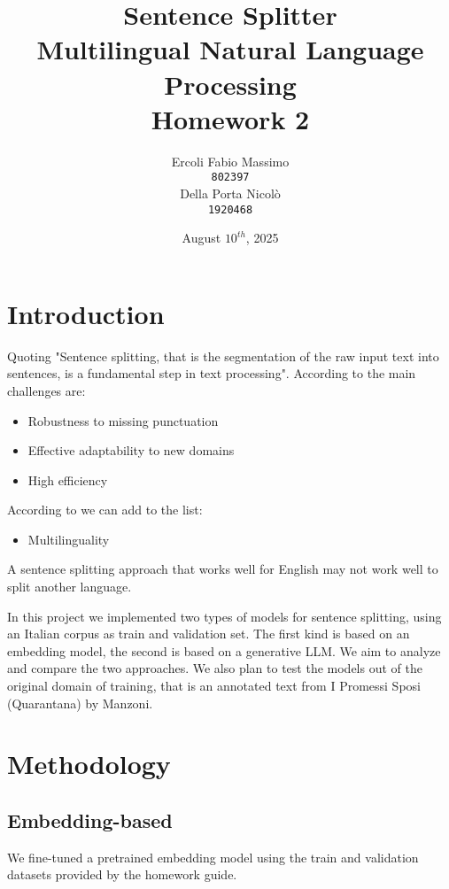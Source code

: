 \documentclass[11pt]{article}
\title{%
	Sentence Splitter\\
	\large Multilingual Natural Language Processing \\
	Homework 2}
\date{August $10^{th}$, 2025}
\author{Ercoli Fabio Massimo \\
\texttt{802397} \\\And
Della Porta Nicolò \\
\texttt{1920468} \\}
\begin{document}
\maketitle

\section{Introduction}

Quoting \cite{redaelli-sprugnoli-2024-sentence} "Sentence splitting, that is the segmentation of the raw input text into sentences, is a fundamental step in text processing".  According to \cite{frohmann2024segmenttextuniversalapproach} the main challenges are:

\begin{itemize}
	\item Robustness to missing punctuation
	\item Effective adaptability to new domains
	\item High efficiency
\end{itemize}

According to \cite{redaelli-sprugnoli-2024-sentence} we can add to the list:

\begin{itemize}
	\item Multilinguality
\end{itemize}

A sentence splitting approach that works well for English may not work well to split another language.

In this project we implemented two types of models for sentence splitting, using an Italian corpus as train and validation set.
The first kind is based on an embedding model, the second is based on a generative LLM.
We aim to analyze and compare the two approaches. 
We also plan to test the models out of the original domain of training, that is an annotated text from I Promessi Sposi (Quarantana) by Manzoni.

\section{Methodology}

\subsection{Embedding-based}

We fine-tuned a pretrained embedding model using the train and validation datasets provided by the homework guide.
\end{document}
